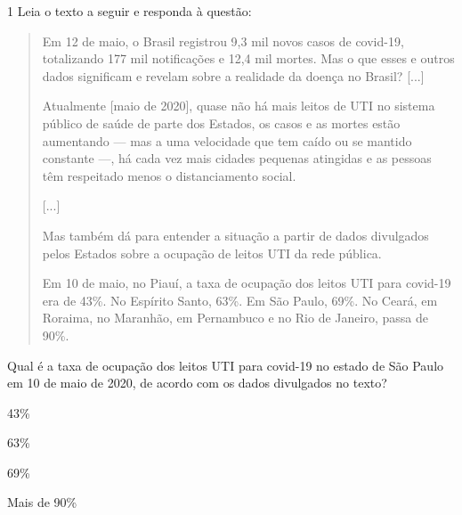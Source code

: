 
\num{1} Leia o texto a seguir e responda à questão:

\begin{quote}
Em 12 de maio, o Brasil registrou 9,3 mil novos casos de covid-19,
totalizando 177 mil notificações e 12,4 mil mortes. Mas o que esses e
outros dados significam e revelam sobre a realidade da doença no Brasil?
{[}...{]}

Atualmente {[}maio de 2020{]}, quase não há mais leitos de UTI no
sistema público de saúde de parte dos Estados, os casos e as mortes
estão aumentando --- mas a uma velocidade que tem caído ou se mantido
constante ---, há cada vez mais cidades pequenas atingidas e as pessoas
têm respeitado menos o distanciamento social.

{[}...{]}

Mas também dá para entender a situação a partir de dados divulgados
pelos Estados sobre a ocupação de leitos UTI da rede pública.

Em 10 de maio, no Piauí, a taxa de ocupação dos leitos UTI para covid-19
era de 43\%. No Espírito Santo, 63\%. Em São Paulo, 69\%. No Ceará, em
Roraima, no Maranhão, em Pernambuco e no Rio de Janeiro, passa de 90\%.


\end{quote}

Qual é a taxa de ocupação dos leitos UTI para covid-19 no estado de São
Paulo em 10 de maio de 2020, de acordo com os dados divulgados no texto?

\begin{escolha}
\item 43\%

\item 63\%

\item 69\%

\item Mais de 90\%
\end{escolha}


